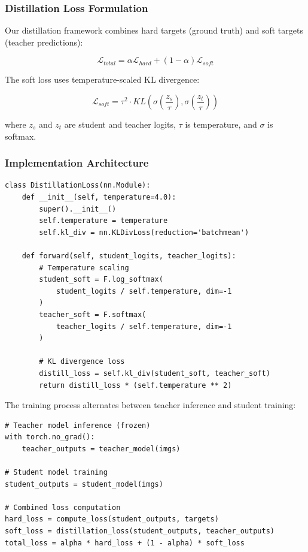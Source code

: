 \documentclass[journal]{IEEEtran}
\begin{document}
\subsubsection{Distillation Loss Formulation}

Our distillation framework combines hard targets (ground truth) and soft targets (teacher predictions):

\begin{equation}
\mathcal{L}_{total} = \alpha \mathcal{L}_{hard} + (1-\alpha) \mathcal{L}_{soft}
\end{equation}

The soft loss uses temperature-scaled KL divergence:

\begin{equation}
\mathcal{L}_{soft} = \tau^2 \cdot KL\left(\sigma\left(\frac{z_s}{\tau}\right), \sigma\left(\frac{z_t}{\tau}\right)\right)
\end{equation}

where $z_s$ and $z_t$ are student and teacher logits, $\tau$ is temperature, and $\sigma$ is softmax.

\subsubsection{Implementation Architecture}

\begin{lstlisting}[caption=Knowledge Distillation Loss]
class DistillationLoss(nn.Module):
    def __init__(self, temperature=4.0):
        super().__init__()
        self.temperature = temperature
        self.kl_div = nn.KLDivLoss(reduction='batchmean')
    
    def forward(self, student_logits, teacher_logits):
        # Temperature scaling
        student_soft = F.log_softmax(
            student_logits / self.temperature, dim=-1
        )
        teacher_soft = F.softmax(
            teacher_logits / self.temperature, dim=-1
        )
        
        # KL divergence loss
        distill_loss = self.kl_div(student_soft, teacher_soft)
        return distill_loss * (self.temperature ** 2)
\end{lstlisting}

The training process alternates between teacher inference and student training:

\begin{lstlisting}[caption=Distillation Training Loop]
# Teacher model inference (frozen)
with torch.no_grad():
    teacher_outputs = teacher_model(imgs)

# Student model training
student_outputs = student_model(imgs)

# Combined loss computation
hard_loss = compute_loss(student_outputs, targets)
soft_loss = distillation_loss(student_outputs, teacher_outputs)
total_loss = alpha * hard_loss + (1 - alpha) * soft_loss
\end{lstlisting}
\end{document}

